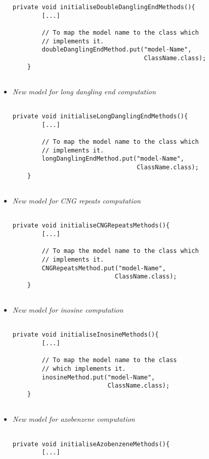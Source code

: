 \documentclass{article}
\begin{document}
\begin{itemize}
\begin{verbatim}
private void initialiseDoubleDanglingEndMethods(){
		[...]
		
		// To map the model name to the class which 
		// implements it.
        doubleDanglingEndMethod.put("model-Name", 
                                    ClassName.class);
	}
	
\end{verbatim}

\item \textit{New model for long dangling end computation}

\begin{verbatim}

private void initialiseLongDanglingEndMethods(){
		[...]
		
		// To map the model name to the class which 
		// implements it.
        longDanglingEndMethod.put("model-Name", 
                                  ClassName.class);
	}
	
\end{verbatim}

\item \textit{New model for CNG repeats computation}

\begin{verbatim}

private void initialiseCNGRepeatsMethods(){
		[...]
		
		// To map the model name to the class which 
		// implements it.
        CNGRepeatsMethod.put("model-Name", 
                            ClassName.class);
	}
	
\end{verbatim}

\item \textit{New model for inosine computation}

\begin{verbatim}

private void initialiseInosineMethods(){
		[...]
		
		// To map the model name to the class 
		// which implements it.
        inosineMethod.put("model-Name", 
                          ClassName.class);
	}
	
\end{verbatim}

\item \textit{New model for azobenzene computation}

\begin{verbatim}

private void initialiseAzobenzeneMethods(){
		[...]
		

\end{verbatim}
\end{itemize}
\end{document}
